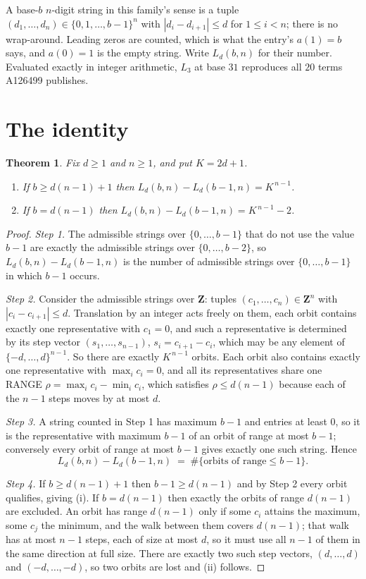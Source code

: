 \documentclass[11pt,a4paper]{article}
\theoremstyle{plain}
\newtheorem{theorem}{Theorem}
\theoremstyle{definition}
\begin{document}
A base-$b$ $n$-digit string in this family's sense is a tuple
$(d_1,\dots,d_n)\in\{0,1,\dots,b-1\}^{n}$ with $|d_i-d_{i+1}|\le d$ for $1\le i<n$; there
is no wrap-around. Leading zeros are counted, which is what the entry's $a(1)=b$ says, and
$a(0)=1$ is the empty string. Write $L_d(b,n)$ for their number. Evaluated exactly in integer
arithmetic, $L_{3}$ at base $31$ reproduces all $20$ terms A126499 publishes.

\section{The identity}

\begin{theorem}
Fix $d\ge1$ and $n\ge1$, and put $K=2d+1$.
\begin{enumerate}
\item[(i)] If $b\ge d(n-1)+1$ then $L_d(b,n)-L_d(b-1,n)=K^{\,n-1}$.
\item[(ii)] If $b=d(n-1)$ then $L_d(b,n)-L_d(b-1,n)=K^{\,n-1}-2$.
\end{enumerate}
\end{theorem}

\begin{proof}
\emph{Step 1.} The admissible strings over $\{0,\dots,b-1\}$ that do not use the value $b-1$
are exactly the admissible strings over $\{0,\dots,b-2\}$, so $L_d(b,n)-L_d(b-1,n)$ is the
number of admissible strings over $\{0,\dots,b-1\}$ in which $b-1$ occurs.

\emph{Step 2.} Consider the admissible strings over $\mathbf{Z}$: tuples
$(c_1,\dots,c_n)\in\mathbf{Z}^{n}$ with $|c_i-c_{i+1}|\le d$. Translation by an integer acts
freely on them, each orbit contains exactly one representative with $c_1=0$, and such a
representative is determined by its step vector $(s_1,\dots,s_{n-1})$, $s_i=c_{i+1}-c_i$,
which may be any element of $\{-d,\dots,d\}^{n-1}$. So there are exactly $K^{\,n-1}$ orbits.
Each orbit also contains exactly one representative with $\max_i c_i=0$, and all its
representatives share one RANGE $\rho=\max_ic_i-\min_ic_i$, which satisfies
$\rho\le d(n-1)$ because each of the $n-1$ steps moves by at most $d$.

\emph{Step 3.} A string counted in Step 1 has maximum $b-1$ and entries at least $0$, so it is
the representative with maximum $b-1$ of an orbit of range at most $b-1$; conversely every orbit
of range at most $b-1$ gives exactly one such string. Hence
\[
L_d(b,n)-L_d(b-1,n)\;=\;\#\{\text{orbits of range}\le b-1\} .
\]

\emph{Step 4.} If $b\ge d(n-1)+1$ then $b-1\ge d(n-1)$ and by Step 2 every orbit qualifies,
giving (i). If $b=d(n-1)$ then exactly the orbits of range $d(n-1)$ are excluded. An orbit has
range $d(n-1)$ only if some $c_i$ attains the maximum, some $c_j$ the minimum, and the walk
between them covers $d(n-1)$; that walk has at most $n-1$ steps, each of size at most $d$, so it
must use all $n-1$ of them in the same direction at full size. There are exactly two such step
vectors, $(d,\dots,d)$ and $(-d,\dots,-d)$, so two orbits are lost and (ii) follows.
\end{proof}
\end{document}
